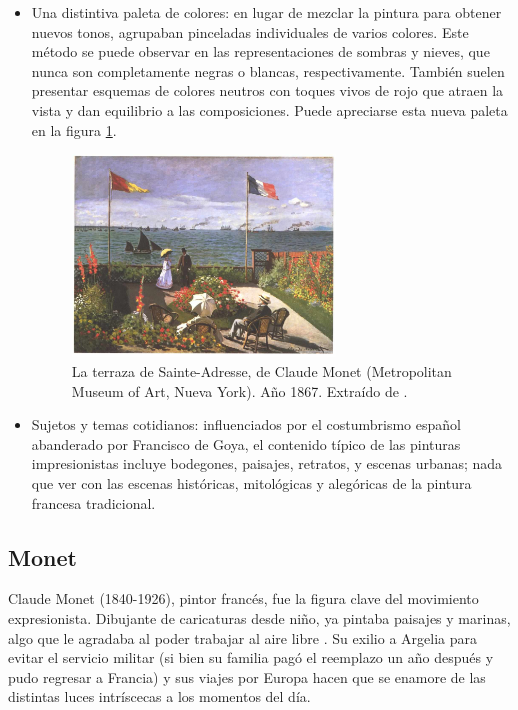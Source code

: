 \documentclass[../main.tex]{subfiles}
\begin{document}
\begin{itemize}
    \item Una distintiva paleta de colores: en lugar de mezclar la pintura para obtener nuevos tonos, agrupaban pinceladas individuales de varios colores. Este método se puede observar en las representaciones de sombras y nieves, que nunca son completamente negras o blancas, respectivamente. También suelen presentar esquemas de colores neutros con toques vivos de rojo que atraen la vista y dan equilibrio a las composiciones. Puede apreciarse esta nueva paleta en la figura \ref{fig:monet_terraza}.
    \begin{figure}[h]
        \centering
        \includegraphics[width=0.66\textwidth]{imagenes/La terraza de Sainte-Adresse.jpg}
        \caption[La terraza de Sainte-Adresse, de Claude Monet]{La terraza de Sainte-Adresse, de Claude Monet (Metropolitan Museum of Art, Nueva York). Año 1867. Extraído de \cite{Monet1867}.}
        \label{fig:monet_terraza}
    \end{figure}
    
    \item Sujetos y temas cotidianos: influenciados por el costumbrismo español abanderado por Francisco de Goya, el contenido típico de las pinturas impresionistas incluye bodegones, paisajes, retratos, y escenas urbanas; nada que ver con las escenas históricas, mitológicas y alegóricas de la pintura francesa tradicional.

\end{itemize}

\subsection{Monet}

Claude Monet (1840-1926), pintor francés, fue la figura clave del movimiento expresionista. Dibujante de caricaturas desde niño, ya pintaba paisajes y marinas, algo que le agradaba al poder trabajar al aire libre \cite{CalvoSantos2016}. Su exilio a Argelia para evitar el servicio militar (si bien su familia pagó el reemplazo un año después y pudo regresar a Francia) y sus viajes por Europa hacen que se enamore de las distintas luces intríscecas a los momentos del día. 
\end{document}
